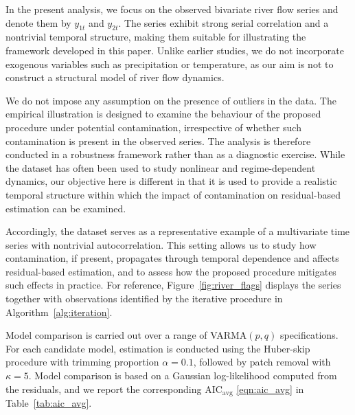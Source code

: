 \documentclass[12pt]{article}
\numberwithin{equation}{section}
\begin{document}
In the present analysis, we focus on the observed bivariate river flow series and denote them by $y_{1t}$ and $y_{2t}$. The series exhibit strong serial correlation and a nontrivial temporal structure, making them suitable for illustrating the framework developed in this paper. Unlike earlier studies, we do not incorporate exogenous variables such as precipitation or temperature, as our aim is not to construct a structural model of river flow dynamics.

We do not impose any assumption on the presence of outliers in the data. The empirical illustration is designed to examine the behaviour of the proposed procedure under potential contamination, irrespective of whether such contamination is present in the observed series. The analysis is therefore conducted in a robustness framework rather than as a diagnostic exercise.
While the dataset has often been used to study nonlinear and regime-dependent dynamics, our objective here is different in that it is used to provide a realistic temporal structure within which the impact of contamination on residual-based estimation can be examined.

Accordingly, the dataset serves as a representative example of a multivariate time series with nontrivial autocorrelation. This setting allows us to study how contamination, if present, propagates through temporal dependence and affects residual-based estimation, and to assess how the proposed procedure mitigates such effects in practice. For reference, Figure~\ref{fig:river_flags} displays the series together with observations identified by the iterative procedure in Algorithm~\ref{alg:iteration}.

Model comparison is carried out over a range of VARMA$(p,q)$ specifications. For each candidate model, estimation is conducted using the Huber-skip procedure with trimming proportion $\alpha=0.1$, followed by patch removal with $\kappa=5$. Model comparison is based on a Gaussian log-likelihood computed from the residuals, and we report the corresponding $\mathrm{AIC}_{\mathrm{avg}}$ \eqref{eqn:aic_avg} in Table~\ref{tab:aic_avg}.
\end{document}
